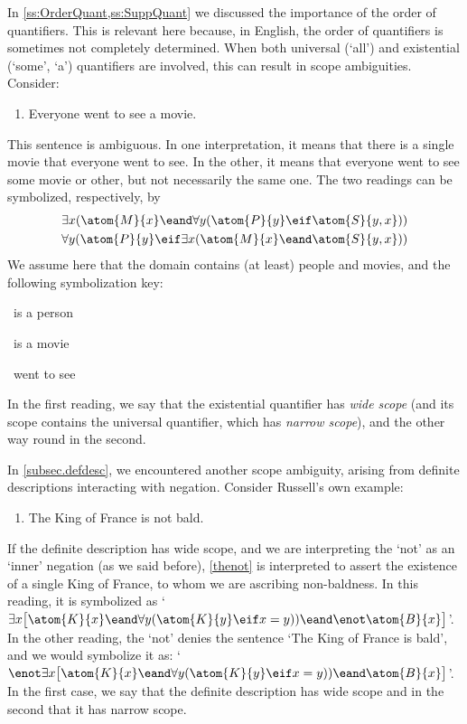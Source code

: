 In \cref{ss:OrderQuant,ss:SuppQuant} we discussed the importance of the order of quantifiers.  This is relevant here because, in English, the order of quantifiers is sometimes not completely determined.  When both universal (`all') and existential (`some', `a') quantifiers are  involved, this can result in scope ambiguities. Consider:
\begin{enumerate}
	\item\label{everya} Everyone went to see a movie.
\end{enumerate}
This sentence is ambiguous.  In one interpretation, it means that there is a single movie that everyone went to see. In the  other, it means that everyone went to see some movie or other, but not necessarily the same one. The two readings can be symbolized, respectively, by 
\begin{align*}
	& \exists x(\atom{M}{x} \eand \forall y(\atom{P}{y} \eif \atom{S}{y,x}))\\
	& \forall y(\atom{P}{y} \eif \exists x(\atom{M}{x} \eand \atom{S}{y,x}))
\end{align*}
We assume here that the domain contains (at least) people and movies,
and the following symbolization key:
\begin{ekey}
	\item[\atom{P}{y}] ~is a person
	\item[\atom{M}{x}] ~is a movie
	\item[\atom{S}{y,x}] ~went to see~
\end{ekey}
In the first reading, we say that the existential quantifier has \emph{wide scope} (and its scope contains the universal quantifier, which has \emph{narrow scope}), and the other way round in the second.

In \cref{subsec.defdesc}, we encountered another scope ambiguity, arising from definite descriptions interacting with negation.  Consider Russell's own example:
\begin{enumerate}
	\item\label{thenot} The King of France is not bald.
\end{enumerate}
If the definite description has wide scope, and we are interpreting the `not' as an `inner' negation (as we said before), \cref*{thenot} is interpreted to assert the existence of a single King of France, to whom we are ascribing non-baldness. In this reading, it is symbolized as `$\exists x\bigl[\atom{K}{x} \eand \forall y(\atom{K}{y} \eif x=y)) \eand \enot \atom{B}{x}\bigr]$'. In the other reading, the `not' denies the sentence `The King of France is bald', and we would symbolize it as: `$\enot\exists x\bigl[\atom{K}{x} \eand \forall y(\atom{K}{y} \eif x=y)) \eand \atom{B}{x}\bigr]$'. In the first case, we say that the definite description has wide scope and in the second that it has narrow scope.

